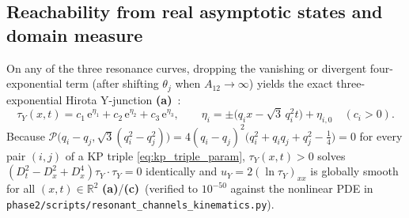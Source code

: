 \documentclass[11pt,a4paper]{article}
\newcommand{\La}{\textsf{\textbf{(a)}}\xspace}
\newcommand{\Lc}{\textsf{\textbf{(c)}}\xspace}
\newcommand{\ee}{\mathrm{e}}
\newcommand{\skin}{\texttt{phase2/\allowbreak scripts/\allowbreak resonant\_\allowbreak channels\_\allowbreak kinematics.py}}
\theoremstyle{remark}
\begin{document}
\subsection{Reachability from real asymptotic states and domain measure}

On any of the three resonance curves, dropping the vanishing or divergent
four-exponential term (after shifting $\theta_j$ when $A_{12}\to\infty$) yields
the exact three-exponential Hirota Y-junction \La~\cite{HI,LMK,RS,DMHC,CZ}:
\begin{equation}\label{eq:tau_Y}
  \tau_Y(x,t) = c_1\,\ee^{\eta_1} + c_2\,\ee^{\eta_2} + c_3\,\ee^{\eta_3}, \qquad
  \eta_i = \pm\big(q_i x - \sqrt{3}\,q_i^2 t\big) + \eta_{i,0} \quad (c_i > 0).
\end{equation}
Because $\mathcal{P}\big(q_i-q_j,\sqrt{3}(q_i^2-q_j^2)\big) = 4(q_i-q_j)^2\big(q_i^2+q_i q_j+q_j^2-\frac{1}{4}\big) = 0$
for every pair $(i,j)$ of a KP triple \eqref{eq:kp_triple_param}, $\tau_Y(x,t)>0$
solves $(D_t^2-D_x^2+D_x^4)\tau_Y\cdot\tau_Y = 0$ identically and $u_Y = 2(\ln\tau_Y)_{xx}$
is globally smooth for all $(x,t)\in\mathbb{R}^2$ \La/\Lc\ (verified to $10^{-50}$
against the nonlinear PDE in \skin).
\end{document}
